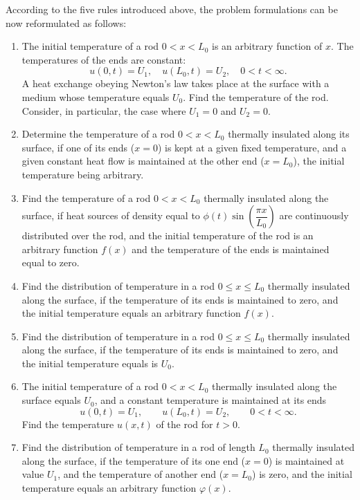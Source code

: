 According to the five rules introduced above, the problem formulations can be now reformulated as follows:
\begin{enumerate}
\item The initial temperature of a rod $0<x<L_{0}$ is an arbitrary function of $x$. The temperatures of the ends are constant:
\begin{equation*}
u(0,t) = U_{1}, \quad u(L_{0},t) = U_{2}, \quad 0<t<\infty.
\end{equation*}
A heat exchange obeying Newton's law takes place at the surface with a medium whose temperature equals $U_{0}$. Find the temperature of the rod. Consider, in particular, the case where $U_{1}=0$ and $U_{2}=0$.
\item Determine the temperature of a rod $0<x<L_{0}$ thermally insulated along its surface, if one of its ends ($x=0$) is kept at a given fixed temperature, and a given constant heat flow is maintained at the other end ($x=L_{0}$), the initial temperature being arbitrary.
\item Find the temperature of a rod $0<x<L_{0}$ thermally insulated along the surface, if heat sources of density equal to $\phi(t)\sin\left(\dfrac{\pi x}{L_{0}}\right)$ are continuously distributed over the rod, and the initial temperature of the rod is an arbitrary function $f(x)$ and the temperature of the ends is maintained equal to zero.
\item Find the distribution of temperature in a rod $0\leq x\leq L_{0}$ thermally insulated along the surface, if the temperature of its ends is maintained to zero, and the initial temperature equals an arbitrary function $f(x)$.
\item Find the distribution of temperature in a rod $0\leq x\leq L_{0}$ thermally insulated along the surface, if the temperature of its ends is maintained to zero, and the initial temperature equals is $U_{0}$.
\item The initial temperature of a rod $0< x< L_{0}$ thermally insulated along the surface equals $U_{0}$, and a constant temperature is maintained at its ends 
\begin{equation*}
u(0,t)=U_{1}, \qquad u(L_{0},t)=U_{2}, \qquad 0<t<\infty.
\end{equation*}
Find the temperature $u(x,t)$ of the rod for $t>0$.
\item Find the distribution of temperature in a rod of length $L_{0}$ thermally insulated along the surface, if the temperature of its one end ($x=0$) is maintained at value $U_{1}$, and the temperature of another end ($x=L_{0}$) is zero, and the initial temperature equals an arbitrary function $\varphi(x)$.

\end{enumerate}
